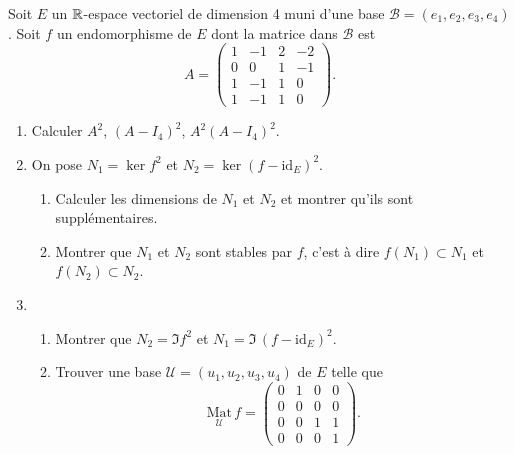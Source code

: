Soit $E$ un $\mathbb{R}$-espace vectoriel de dimension 4 muni d'une base $\mathcal{B}=(e_{1},e_{2},e_{3},e_{4})$.\newline
Soit $f$ un endomorphisme de $E$ dont la matrice dans $\mathcal{B}$ est
\begin{displaymath}
 A=
\begin{pmatrix}
1 & -1 & 2 & -2 \\
0 & 0 & 1 & -1 \\
1 & -1 & 1 & 0 \\
1 & -1 & 1 & 0 
\end{pmatrix} .
\end{displaymath}
\begin{enumerate}
\item Calculer $A^2$, $(A-I_4)^2$, $A^2(A-I_4)^2$. 

\item On pose $N_{1}= \ker f^{2}$ et $N_{2}=\ker (f-\mathrm{id}_{E})^{2}$.
\begin{enumerate}
\item Calculer les dimensions de $N_{1}$ et $N_{2}$ et montrer qu'ils sont supplémentaires.
\item Montrer que $N_{1}$ et $N_{2}$ sont stables par $f$, c'est à dire  $f(N_{1}) \subset N_{1}$ et $f(N_{2}) \subset N_{2}$.
\end{enumerate}

\item \begin{enumerate}
\item Montrer que $N_{2}= \Im f^{2}$ et $N_{1}=\Im\,(f-\mathrm{id}_{E})^{2}$.
\item Trouver une base $\mathcal{U}=(u_{1},u_{2},u_{3},u_{4})$ de $E$ telle que
\[\underset{\mathcal{U}}{\mathrm{Mat}}\,f =
\begin{pmatrix}
0 & 1 & 0 & 0 \\
0 & 0 & 0 & 0 \\
0 & 0 & 1 & 1 \\
0 & 0 & 0 & 1
\end{pmatrix} .
\]
\end{enumerate}

\end{enumerate}

